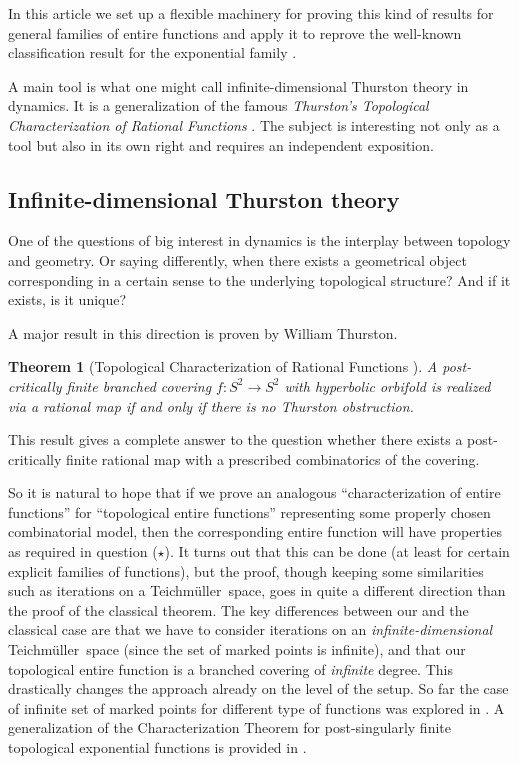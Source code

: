 \documentclass[10pt,reqno,a4paper]{amsart}
\numberwithin{figure}{section}
\numberwithin{equation}{section}
\newtheorem*{thmnonum}{Theorem}
\newcommand{\tei}{Teichm\"uller}
\begin{document}
In this article we set up a flexible machinery for proving this kind of results for general families of entire functions and apply it to reprove the well-known classification result for the exponential family \cite{MarkusThesis}.

A main tool is what one might call infinite-dimensional Thurston theory in dynamics. It is a generalization of the famous \emph{Thurston's Topological Characterization of Rational Functions} \cite{DH}. The subject is interesting not only as a tool but also in its own right and requires an independent exposition.

\subsection*{Infinite-dimensional Thurston theory}

One of the questions of big interest in dynamics is the interplay between topology and geometry. Or saying differently, when there exists a geometrical object corresponding in a certain sense to the underlying topological structure? And if it exists, is it unique?

A major result in this direction is proven by William Thurston.

\begin{thmnonum}[Topological Characterization of Rational Functions \cite{DH,HubbardBook2}]
	A post-critically finite branched covering $f:S^2\to S^2$ with hyperbolic orbifold is realized via a rational map if and only if there is no Thurston obstruction.
\end{thmnonum}

This result gives a complete answer to the question whether there exists a post-critically finite rational map with a prescribed combinatorics of the covering.

So it is natural to hope that if we prove an analogous ``characterization of entire functions'' for ``topological entire functions'' representing some properly chosen combinatorial model, then the corresponding entire function will have properties as required in question ($\star$). It turns out that this can be done (at least for certain explicit families of functions), but the proof, though keeping some similarities such as iterations on a \tei\ space, goes in quite a different direction than the proof of the classical theorem. The key differences between our and the classical case are that we have to consider iterations on an \emph{infinite-dimensional} \tei\ space (since the set of marked points is infinite), and that our topological entire function is a branched covering of \emph{infinite} degree. This drastically changes the approach already on the level of the setup. So far the case of infinite set of marked points for different type of functions was explored in \cite{BrownThesis,Cui,MarkusThesis}. A generalization of the Characterization Theorem for post-singularly finite topological exponential functions is provided in \cite{HSS}.
\end{document}
